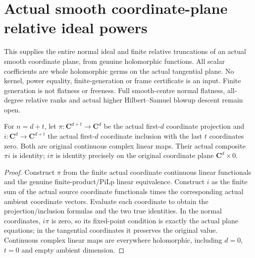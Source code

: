 \section{Actual smooth coordinate-plane relative ideal powers}
\label{sec:hironaka-relative-normal-ideal}

This supplies the entire normal ideal and finite relative truncations of an
actual smooth coordinate plane, from genuine holomorphic functions. All scalar
coefficients are whole holomorphic germs on the actual tangential plane. No
kernel, power equality, finite-generation or frame certificate is an input.
Finite generation is not flatness or freeness. Full smooth-centre normal
flatness, all-degree relative ranks and actual higher Hilbert--Samuel blowup
descent remain open.

\begin{definition}
\label{hir:relative-normal-original-split}
\leanok
For $n=d+t$, let $\pi:\mathbf C^{d+t}\to\mathbf C^d$ be the actual first-$d$
coordinate projection and $i:\mathbf C^d\to\mathbf C^{d+t}$ the actual first-$d$
coordinate inclusion with the last $t$ coordinates zero. Both are original
continuous complex linear maps. Their actual composite $\pi i$ is identity;
$i\pi$ is identity precisely on the original coordinate plane $\mathbf C^d\times0$.
\end{definition}
\begin{proof}
Construct $\pi$ from the finite actual coordinate continuous linear functionals
and the genuine finite-product/PiLp linear equivalence. Construct $i$ as the
finite sum of the actual source coordinate functionals times the corresponding
actual ambient coordinate vectors. Evaluate each coordinate to obtain the
projection/inclusion formulas and the two true identities. In the normal
coordinates, $i\pi$ is zero, so its fixed-point condition is exactly the actual
plane equations; in the tangential coordinates it preserves the original value.
Continuous complex linear maps are everywhere holomorphic, including $d=0$,
$t=0$ and empty ambient dimension.
\end{proof}

